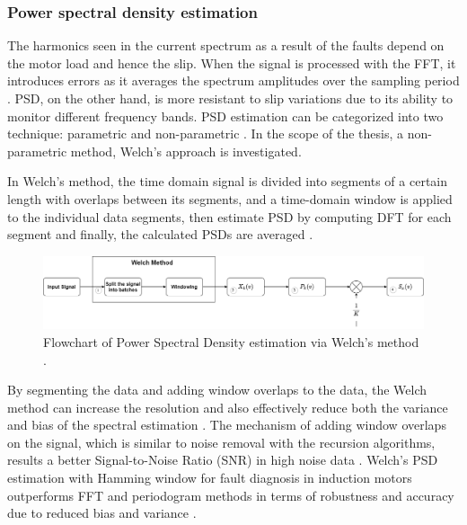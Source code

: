\subsubsection{Power spectral density estimation}

The harmonics seen in the current spectrum as a result of the faults depend on the motor load and hence the slip. When the signal is processed with the FFT, it introduces errors as it averages the spectrum amplitudes over the sampling period \cite{cusidocusido2008fault,irvine2002introduction}. PSD, on the other hand, is more resistant to slip variations due to its ability to monitor different frequency bands. PSD estimation can be categorized into two technique: parametric and non-parametric \cite{zerdani2020inter,heydarzadeh2016gearbox}. In the scope of the thesis, a non-parametric method, Welch's approach is investigated.

In Welch's method, the time domain signal is divided into segments of a certain length with overlaps between its segments, and a time-domain window is applied to the individual data segments, then estimate PSD by computing DFT for each segment and finally, the calculated PSDs are averaged \cite{jwo2021windowing,stoica2005spectral,schmid2012use}.

\begin{figure}[h]
	\centering
	\includegraphics[width=400pt,keepaspectratio=true]{./fig/welchdiagram.png}
	\caption{Flowchart of Power Spectral Density estimation via Welch's method \cite{jwo2021windowing}.}	
	\label{welchdiagram}
\end{figure}

By segmenting the data and adding window overlaps to the data, the Welch method can increase the resolution and also effectively reduce both the variance and bias of the spectral estimation \cite{stoica2005spectral,al2010advanced,zerdani2020inter}. The mechanism of adding window overlaps on the signal, which is similar to noise removal with the recursion algorithms, results a better Signal-to-Noise Ratio (SNR) in high noise data \cite{jwo2021windowing,jin2020intelligent,irvine2002introduction}. Welch's PSD estimation with Hamming window for fault diagnosis in induction motors outperforms FFT and periodogram methods in terms of robustness and accuracy due to reduced bias and variance \cite{ayhan2003case}.

